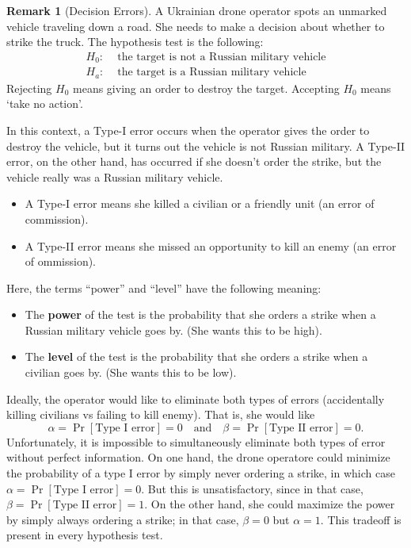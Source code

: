 \documentclass[10pt]{article}
\theoremstyle{definition}
\newtheorem{remark}[theorem]{Remark}
\newcommand{\1}[1]{\textbf{1}_{\left[#1\right]}} %
\begin{document}
\begin{remark}[Decision Errors]
  \label{rmk:decision-errors}
  A Ukrainian drone operator spots an unmarked vehicle traveling down a road.
  She needs to make a decision about whether to strike the truck. The
  hypothesis test is the following:
  \begin{align*}
    H_{0}:& \text{ the target is not a Russian military vehicle}\\
    H_{a}:& \text{ the target is a Russian military vehicle}
  \end{align*}
  Rejecting $H_{0}$ means giving an order to destroy the target. Accepting
  $H_{0}$ means `take no action'.

  In this context, a Type-I error occurs when the operator gives the order to
  destroy the vehicle, but it turns out the vehicle is not Russian military. A
  Type-II error, on the other hand, has occurred if she doesn't order the
  strike, but the vehicle really was a Russian military vehicle.
  \begin{itemize}
    \item A Type-I error means she killed a civilian or a friendly unit (an
    error of commission).
    \item A Type-II error means she missed an opportunity to kill an enemy (an
    error of ommission).
  \end{itemize}
  Here, the terms ``power'' and ``level'' have the following meaning:
  \begin{itemize}
    \item The \textbf{power} of the test is the probability that she
    orders a strike when a Russian military vehicle goes by. (She wants this
    to be high).
    \item The \textbf{level} of the test is the probability that she orders a
    strike when a civilian goes by. (She wants this to be low).
  \end{itemize}
  Ideally, the operator would like to eliminate both types of errors
  (accidentally killing civilians vs failing to kill enemy). That is, she
  would like
  \begin{equation*}
    \alpha=\Pr\left[\text{Type I error} \right]= 0 \quad \text{and} \quad
    \beta=\Pr\left[\text{Type II error} \right]=0.
  \end{equation*}
  Unfortunately, it is impossible to simultaneously eliminate both types of
  error without perfect information. On one hand, the drone operatore could
  minimize the probability of a type I error by simply never ordering a strike,
  in which case $\alpha= \Pr\left[ \text{Type I error} \right] = 0$. But this
  is unsatisfactory, since in that case,
  $\beta= \Pr\left[\text{Type II error} \right]=1$. On the other hand, she
  could maximize the power by simply always ordering a strike; in that case,
  $\beta=0$ but $\alpha=1$. This tradeoff is present in every hypothesis test.
  

\end{remark}
\end{document}
